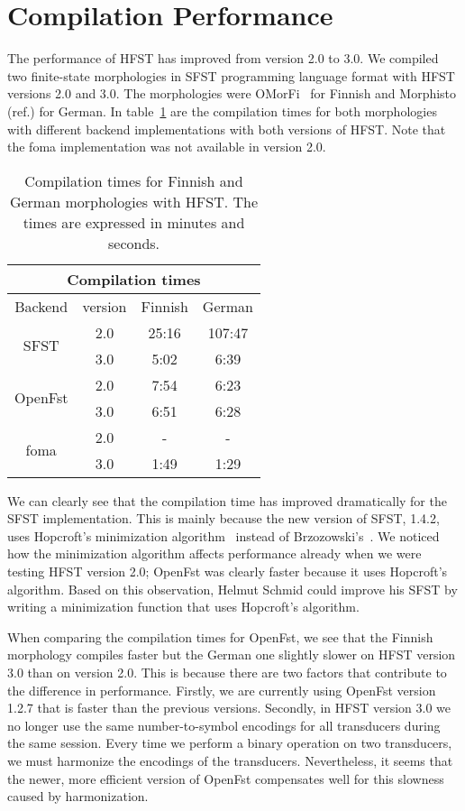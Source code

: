 \documentclass{llncs}
\begin{document}
\section{Compilation Performance}

The performance of HFST has improved from version 2.0 to 3.0. 
We compiled two finite-state morphologies in SFST programming language format
with HFST versions 2.0 and 3.0. 
The morphologies were OMorFi~\cite{pirinen/2008} for Finnish and Morphisto (ref.) for German.
In table~\ref{tab:compilation_times} are the compilation times 
for both morphologies with 
different backend implementations with both versions of HFST. 
Note that the foma implementation was not available in version 2.0.

\begin{table}
\centering
  \begin{tabular}{ c | c | c | c }
  \multicolumn{4}{c}{Compilation times} \\ \hline
  Backend & version & Finnish & German \\ \hline
  \multirow{2}{*}{SFST} & 2.0 & 25:16 & 107:47 \\
  & 3.0 & 5:02 & 6:39 \\ \hline
  \multirow{2}{*}{OpenFst} & 2.0 & 7:54 & 6:23 \\
  & 3.0 & 6:51 & 6:28 \\ \hline
  \multirow{2}{*}{foma} & 2.0 & - & - \\
  & 3.0 & 1:49 & 1:29 \\
  \end{tabular}
  \caption{Compilation times for Finnish and German morphologies with
    HFST. The times are expressed in minutes and seconds.}
  \label{tab:compilation_times}
\end{table}

We can clearly see that the compilation time has improved dramatically
for the SFST implementation.
This is mainly because the new version of SFST, 1.4.2, uses Hopcroft's
minimization algorithm~\cite{hopcroft/1971} instead of 
Brzozowski's~\cite{brzozowski/1964}. 
We noticed how the minimization algorithm affects performance
already when we were testing HFST version 2.0; 
OpenFst was clearly faster because it uses Hopcroft's algorithm. 
Based on this observation, Helmut Schmid could improve his SFST by 
writing a minimization function that uses Hopcroft's algorithm.

When comparing the compilation times for OpenFst, we see that the
Finnish morphology compiles faster but the German one slightly slower
on HFST version 3.0 than on version 2.0. This is because there are two
factors that contribute to the difference in performance. Firstly, we
are currently using OpenFst version 1.2.7 that is faster than the
previous versions. Secondly, in HFST version 3.0 we no longer use the
same number-to-symbol encodings for all transducers during the same
session. Every time we perform a binary operation on two transducers,
we must harmonize the encodings of the transducers. Nevertheless, 
it seems that the newer, more efficient version of
OpenFst compensates well for this slowness caused by harmonization. 
\end{document}
